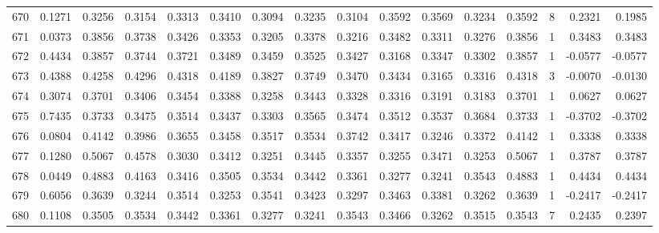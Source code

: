 \begin{tabular}{lrrrrrrrrrrrrrrr}
670 &      0.1271 &  0.3256 &  0.3154 &  0.3313 &  0.3410 &  0.3094 &  0.3235 &  0.3104 &  0.3592 &  0.3569 &   0.3234 &     0.3592 &      8 &                    0.2321 &                     0.1985 \\
671 &      0.0373 &  0.3856 &  0.3738 &  0.3426 &  0.3353 &  0.3205 &  0.3378 &  0.3216 &  0.3482 &  0.3311 &   0.3276 &     0.3856 &      1 &                    0.3483 &                     0.3483 \\
672 &      0.4434 &  0.3857 &  0.3744 &  0.3721 &  0.3489 &  0.3459 &  0.3525 &  0.3427 &  0.3168 &  0.3347 &   0.3302 &     0.3857 &      1 &                   -0.0577 &                    -0.0577 \\
673 &      0.4388 &  0.4258 &  0.4296 &  0.4318 &  0.4189 &  0.3827 &  0.3749 &  0.3470 &  0.3434 &  0.3165 &   0.3316 &     0.4318 &      3 &                   -0.0070 &                    -0.0130 \\
674 &      0.3074 &  0.3701 &  0.3406 &  0.3454 &  0.3388 &  0.3258 &  0.3443 &  0.3328 &  0.3316 &  0.3191 &   0.3183 &     0.3701 &      1 &                    0.0627 &                     0.0627 \\
675 &      0.7435 &  0.3733 &  0.3475 &  0.3514 &  0.3437 &  0.3303 &  0.3565 &  0.3474 &  0.3512 &  0.3537 &   0.3684 &     0.3733 &      1 &                   -0.3702 &                    -0.3702 \\
676 &      0.0804 &  0.4142 &  0.3986 &  0.3655 &  0.3458 &  0.3517 &  0.3534 &  0.3742 &  0.3417 &  0.3246 &   0.3372 &     0.4142 &      1 &                    0.3338 &                     0.3338 \\
677 &      0.1280 &  0.5067 &  0.4578 &  0.3030 &  0.3412 &  0.3251 &  0.3445 &  0.3357 &  0.3255 &  0.3471 &   0.3253 &     0.5067 &      1 &                    0.3787 &                     0.3787 \\
678 &      0.0449 &  0.4883 &  0.4163 &  0.3416 &  0.3505 &  0.3534 &  0.3442 &  0.3361 &  0.3277 &  0.3241 &   0.3543 &     0.4883 &      1 &                    0.4434 &                     0.4434 \\
679 &      0.6056 &  0.3639 &  0.3244 &  0.3514 &  0.3253 &  0.3541 &  0.3423 &  0.3297 &  0.3463 &  0.3381 &   0.3262 &     0.3639 &      1 &                   -0.2417 &                    -0.2417 \\
680 &      0.1108 &  0.3505 &  0.3534 &  0.3442 &  0.3361 &  0.3277 &  0.3241 &  0.3543 &  0.3466 &  0.3262 &   0.3515 &     0.3543 &      7 &                    0.2435 &                     0.2397 \\

\end{tabular}
